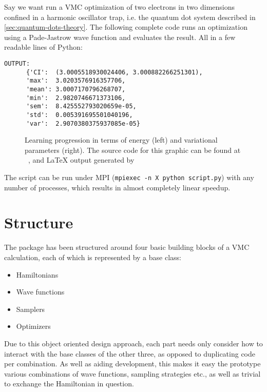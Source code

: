 \documentclass[Thesis.tex]{subfiles}
\begin{document}
Say we want run a VMC optimization of two electrons in two
dimensions confined in a harmonic oscillator trap, i.e. the quantum dot system
described in \cref{sec:quantum-dots-theory}. The following complete code runs an
optimization using a Pade-Jastrow wave function and evaluates the result. All in
a few readable lines of Python:\\



\begin{lstlisting}[basicstyle=\scriptsize]
  OUTPUT:
      {'CI':  (3.0005518930024406, 3.000882266251301),
      'max':  3.0203576916357706,
      'mean': 3.0007170796268707,
      'min':  2.9820746671373106,
      'sem':  8.425552793020659e-05,
      'std':  0.005391695501040196,
      'var':  2.9070380375937085e-05}
\end{lstlisting}

\begin{figure}[h]
  \centering
      
  \caption{Learning progression in terms of energy (left) and variational
    parameters (right). The source code for this graphic can be found
    at ~\cite[TODO: Add
    path]{MS-thesis-repository}, and \LaTeX{} output generated
    by~\cite{nico_schlomer_2018_1173090}}
  \label{fig:quickstart-example}
\end{figure}

\noindent The script can be run under MPI (\texttt{mpiexec -n X python script.py}) with any number of processes, which
results in almost completely linear speedup.

\section{Structure}

The package has been structured around four basic building blocks of a VMC
calculation, each of which is represented by a base class:

\begin{itemize}
\item Hamiltonians
\item Wave functions
\item Samplers
\item Optimizers
\end{itemize}

Due to this object oriented design approach, each part needs only consider how
to interact with the base classes of the other three, as opposed to duplicating
code per combination. As well as aiding development, this makes it easy the
prototype various combinations of wave functions, sampling strategies etc., as
well as trivial to exchange the Hamiltonian in question.
\end{document}
